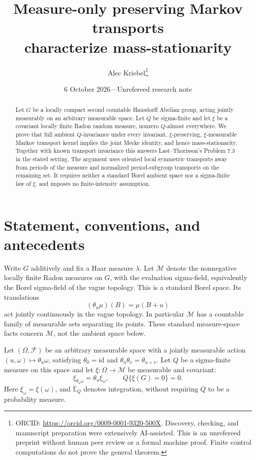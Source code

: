 \documentclass[11pt]{article}
\title{Measure-only preserving Markov transports\protect\\ characterize mass-stationarity}
\author{Alec Kriebel\thanks{ORCID: \url{https://orcid.org/0009-0001-9320-500X}. Discovery, checking, and manuscript preparation were extensively AI-assisted. This is an unrefereed preprint without human peer review or a formal machine proof. Finite control computations do not prove the general theorem.}}
\date{6 October 2026\quad---\quad Unrefereed research note}
\newcommand{\MM}{\mathcal M}
\newcommand{\FF}{\mathcal F}
\newcommand{\EQ}{\mathbb E_Q}
\begin{document}
\maketitle
\begin{abstract}
Let $G$ be a locally compact second countable Hausdorff Abelian group, acting jointly measurably on an arbitrary measurable space. Let $Q$ be sigma-finite and let $\xi$ be a covariant locally finite Radon random measure, nonzero $Q$-almost everywhere. We prove that full ambient $Q$-invariance under every invariant, $\xi$-preserving, $\xi$-measurable Markov transport kernel implies the joint Mecke identity, and hence mass-stationarity. Together with known transport invariance this answers Last--Thorisson's Problem 7.3 in the stated setting. The argument uses oriented local symmetric transports away from periods of the measure and normalized period-subgroup transports on the remaining set. It requires neither a standard Borel ambient space nor a sigma-finite law of $\xi$, and imposes no finite-intensity assumption.
\end{abstract}

\section{Statement, conventions, and antecedents}

Write $G$ additively and fix a Haar measure $\lambda$. Let $\MM$ denote the nonnegative locally finite Radon measures on $G$, with the evaluation sigma-field, equivalently the Borel sigma-field of the vague topology. This is a standard Borel space. Its translations
\[
  (\theta_u\mu)(B)=\mu(B+u)
\]
act jointly continuously in the vague topology. In particular $\MM$ has a countable family of measurable sets separating its points. These standard measure-space facts concern $\MM$, not the ambient space below.

Let $(\Omega,\FF)$ be an arbitrary measurable space with a jointly measurable action $(u,\omega)\mapsto\theta_u\omega$, satisfying $\theta_0=\mathrm{id}$ and $\theta_u\theta_v=\theta_{u+v}$. Let $Q$ be a sigma-finite measure on this space and let $\xi:\Omega\to\MM$ be measurable and covariant:
\[
  \xi_{\theta_u\omega}=\theta_u\xi_\omega,
  \qquad Q\{\xi(G)=0\}=0.
\]
Here $\xi_\omega=\xi(\omega)$, and $\EQ$ denotes integration, without requiring $Q$ to be a probability measure.
\end{document}
